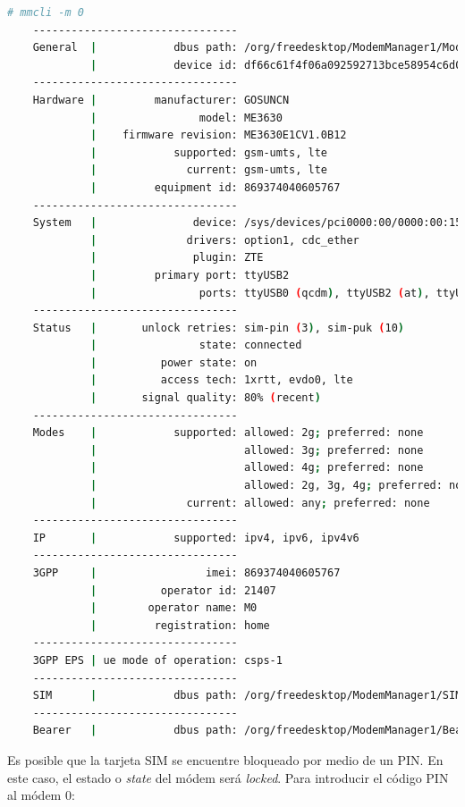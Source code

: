 \documentclass[a4paper, 11pt, titlepage]{book}
\begin{document}
            \begin{lstlisting}[language=bash,basicstyle=\tiny]
    # mmcli -m 0
    --------------------------------
    General  |            dbus path: /org/freedesktop/ModemManager1/Modem/0
             |            device id: df66c61f4f06a092592713bce58954c6d091a565
    --------------------------------
    Hardware |         manufacturer: GOSUNCN
             |                model: ME3630
             |    firmware revision: ME3630E1CV1.0B12
             |            supported: gsm-umts, lte
             |              current: gsm-umts, lte
             |         equipment id: 869374040605767
    --------------------------------
    System   |               device: /sys/devices/pci0000:00/0000:00:15.0/usb1/1-5
             |              drivers: option1, cdc_ether
             |               plugin: ZTE
             |         primary port: ttyUSB2
             |                ports: ttyUSB0 (qcdm), ttyUSB2 (at), ttyUSB1 (at)
    --------------------------------
    Status   |       unlock retries: sim-pin (3), sim-puk (10)
             |                state: connected
             |          power state: on
             |          access tech: 1xrtt, evdo0, lte
             |       signal quality: 80% (recent)
    --------------------------------
    Modes    |            supported: allowed: 2g; preferred: none
             |                       allowed: 3g; preferred: none
             |                       allowed: 4g; preferred: none
             |                       allowed: 2g, 3g, 4g; preferred: none
             |              current: allowed: any; preferred: none
    --------------------------------
    IP       |            supported: ipv4, ipv6, ipv4v6
    --------------------------------
    3GPP     |                 imei: 869374040605767
             |          operator id: 21407
             |        operator name: M0
             |         registration: home
    --------------------------------
    3GPP EPS | ue mode of operation: csps-1
    --------------------------------
    SIM      |            dbus path: /org/freedesktop/ModemManager1/SIM/0
    --------------------------------
    Bearer   |            dbus path: /org/freedesktop/ModemManager1/Bearer/0\end{lstlisting}
    
            Es posible que la tarjeta SIM se encuentre bloqueado por medio de un PIN. 
            En este caso, el estado o \textit{state} del módem será \textit{locked}. 
            Para introducir el código PIN al módem $0$:
\end{document}
